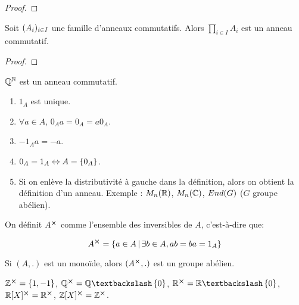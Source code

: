 \ifdefined\outputproof
\begin{proof}

\end{proof}
\fi

\begin{proposition}
	Soit $(A_{i})_{i \in I}$ une famille d'anneaux commutatifs. Alors
	$\displaystyle \prod_{i \in I} A_{i}$ est un anneau commutatif.
\end{proposition}

\ifdefined\outputproof
\begin{proof}

\end{proof}
\fi

\begin{exemple}
	$\mathbb{Q}^{\mathbb{N}}$ est un anneau commutatif.
\end{exemple}

\begin{remarque}
	\begin{enumerate}
		\item $1_{A}$ est unique.
		\item $\forall a \in A$, $0_{A} a = 0_{A} = a 0_{A}$.
		\item $-1_{A} a = -a$.
		\item $0_{A} = 1_{A} \Leftrightarrow A = \left\{ 0_{A} \right\}$.
		\item Si on enlève la distributivité à gauche dans la définition, alors
			on obtient la définition d'un anneau. Exemple : $M_{n}(\mathbb{R})$,
			$M_{n}(\mathbb{C})$, $End(G)$ ($G$ groupe abélien).
	\end{enumerate}
\end{remarque}

\begin{definition}
	On définit $A^{\cross}$ comme l'ensemble des inversibles de $A$, c'est-à-dire
	que:

	\begin{equation*}
		A^{\cross} = \left\{a \in A \, | \, \exists b \in A, ab = ba = 1_{A} \right\}
	\end{equation*}
\end{definition}

\begin{remarque}
	Si $(A, .)$ est un monoïde, alors $(A^{\cross}, .)$ est un groupe
	abélien.
\end{remarque}

\begin{exemple}
	$\mathbb{Z}^{\cross} = \left\{ 1, -1 \right\}$, $\rational^{\cartprod} = \rational
	\textbackslash \GSset{0}$, $\real^{\cartprod} = \real \textbackslash
	\GSset{0}$, $\mathbb{R}[X]^{\cross} = \mathbb{R}^{\cross}$,
	$\mathbb{Z}[X]^{\cross} = \mathbb{Z}^{\cross}$.
\end{exemple}


